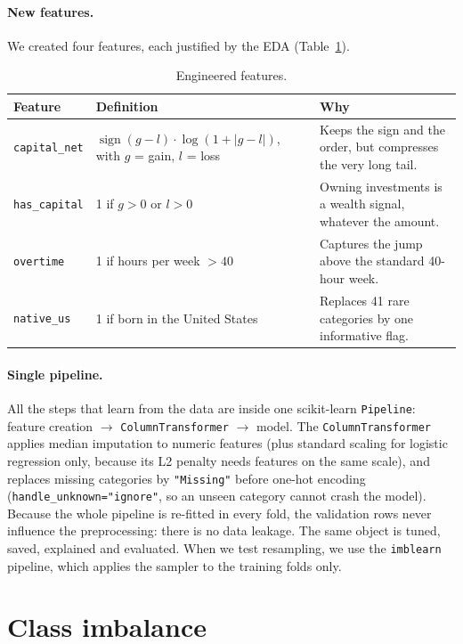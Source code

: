\documentclass[11pt,a4paper]{article}
\begin{document}
\paragraph{New features.} We created four features, each justified by the EDA (Table~\ref{tab:features}).

\begin{table}[!htbp]
\centering
\small
\caption{Engineered features.}
\label{tab:features}
\begin{tabular}{lp{5.2cm}p{7cm}}
\toprule
\textbf{Feature} & \textbf{Definition} & \textbf{Why} \\
\midrule
\texttt{capital\_net} & $\operatorname{sign}(g-l)\cdot\log(1+|g-l|)$, with $g$ = gain, $l$ = loss & Keeps the sign and the order, but compresses the very long tail. \\
\texttt{has\_capital} & 1 if $g>0$ or $l>0$ & Owning investments is a wealth signal, whatever the amount. \\
\texttt{overtime} & 1 if hours per week $>40$ & Captures the jump above the standard 40-hour week. \\
\texttt{native\_us} & 1 if born in the United States & Replaces 41 rare categories by one informative flag. \\
\bottomrule
\end{tabular}
\end{table}

\paragraph{Single pipeline.}
All the steps that learn from the data are inside one scikit-learn \texttt{Pipeline}:
feature creation $\rightarrow$ \texttt{ColumnTransformer} $\rightarrow$ model.
The \texttt{ColumnTransformer} applies median imputation to numeric features (plus standard scaling for logistic regression only, because its L2 penalty needs features on the same scale), and replaces missing categories by \texttt{"Missing"} before one-hot encoding (\texttt{handle\_unknown="ignore"}, so an unseen category cannot crash the model).
Because the whole pipeline is re-fitted in every fold, the validation rows never influence the preprocessing: there is no data leakage. The same object is tuned, saved, explained and evaluated. When we test resampling, we use the \texttt{imblearn} pipeline, which applies the sampler to the training folds only.

\section{Class imbalance}
\label{sec:imbalance}
\end{document}
